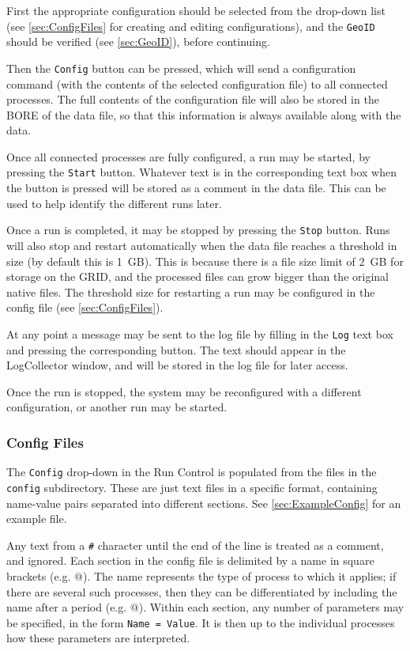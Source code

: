 First the appropriate configuration should be selected from the drop-down list
(see \autoref{sec:ConfigFiles} for creating and editing configurations),
and the \texttt{GeoID} should be verified (see \autoref{sec:GeoID}), before continuing.

Then the \texttt{Config} button can be pressed,
which will send a configuration command
(with the contents of the selected configuration file) to all connected processes.
The full contents of the configuration file will also be stored
in the \gls{BORE} of the data file,
so that this information is always available along with the data.

Once all connected processes are fully configured, a run may be started, by pressing the \texttt{Start} button.
Whatever text is in the corresponding text box when the button is pressed
will be stored as a comment in the data file.
This can be used to help identify the different runs later.

Once a run is completed, it may be stopped by pressing the \texttt{Stop} button.
Runs will also stop and restart automatically when the data file reaches a threshold in size
(by default this is 1~GB).
This is because there is a file size limit of 2~GB for storage on the GRID,
and the processed files can grow bigger than the original native files.
The threshold size for restarting a run may be configured in the config file (see \autoref{sec:ConfigFiles}).

At any point a message may be sent to the log file by filling in the \texttt{Log} text box and pressing the corresponding button.
The text should appear in the LogCollector window, and will be stored in the log file for later access.

Once the run is stopped, the system may be reconfigured with a different configuration, or another run may be started.

\subsubsection{Config Files}\label{sec:ConfigFiles}
The \texttt{Config} drop-down in the Run Control is populated from the files in the \texttt{config} subdirectory.
These are just text files in a specific format, containing name-value pairs separated into different sections.
See \autoref{sec:ExampleConfig} for an example file.

Any text from a \texttt{\#} character until the end of the line is treated as a comment, and
ignored.  Each section in the config file is delimited by a name in square brackets
(e.g. \verb@[RunControl]@).  The name represents the type of process to which it applies; if there
are several such processes, then they can be differentiated by including the name after a period
(e.g. @).  Within each section, any number of parameters may be specified,
in the form \mbox{\texttt{Name = Value}}.  It is then up to the individual processes how these
parameters are interpreted.

